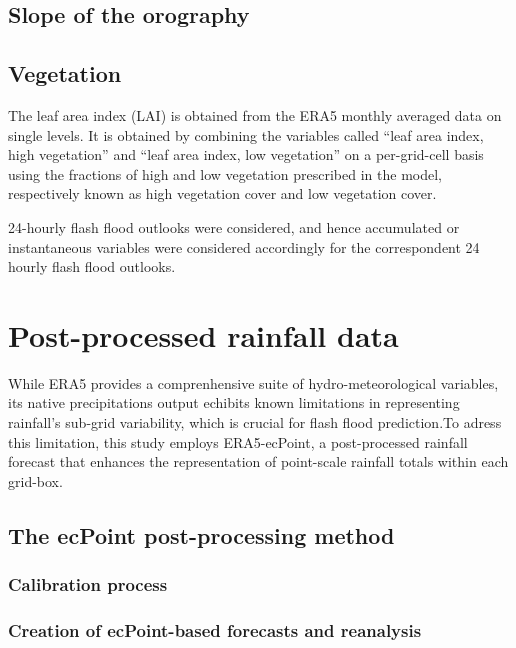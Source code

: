 \subsection{Slope of the orography}


\subsection{Vegetation}

The leaf area index (LAI) is obtained from the ERA5 monthly averaged data on single levels. It is obtained by combining the variables called “leaf area index, high vegetation” and “leaf area index, low vegetation” on a per-grid-cell basis using the fractions of high and low vegetation prescribed in the model, respectively known as high vegetation cover and low vegetation cover.




24-hourly flash flood outlooks were considered, and hence accumulated or instantaneous variables were considered accordingly for the correspondent 24 hourly flash flood outlooks.





\section{Post-processed rainfall data}

While ERA5 provides a comprenhensive suite of hydro-meteorological variables, its native precipitations output echibits known limitations in representing rainfall's sub-grid variability, which is crucial for flash flood prediction.To adress this limitation, this study employs ERA5-ecPoint, a post-processed rainfall forecast that enhances the representation of point-scale rainfall totals within each grid-box.  

\subsection{The ecPoint post-processing method}

\subsubsection{Calibration process}

\subsubsection{Creation of ecPoint-based forecasts and reanalysis}

